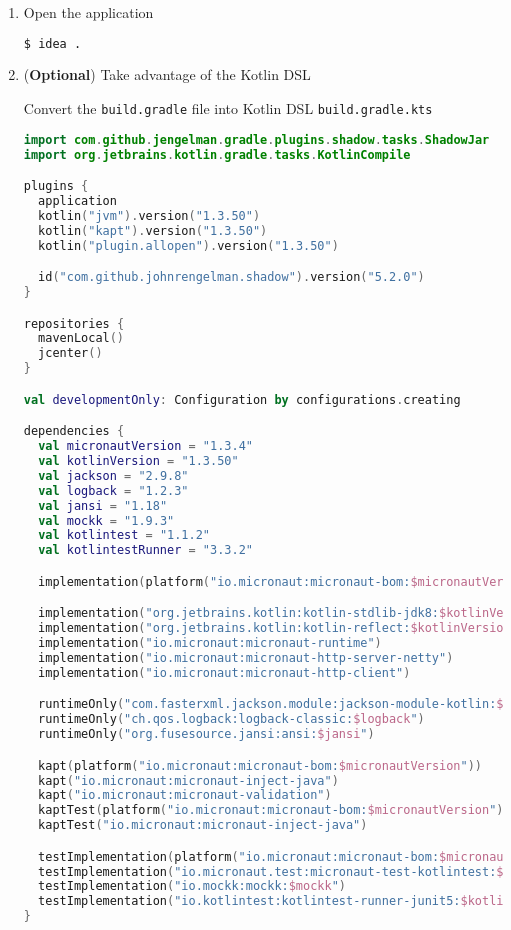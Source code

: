 \documentclass[12pt, letterpaper]{article}
\begin{document}
\begin{enumerate}

	\item Open the application
	      \begin{lstlisting}[language=bash]
$ idea .
	      \end{lstlisting}

	\item (\textbf{Optional}) Take advantage of the Kotlin DSL

	      Convert the \texttt{build.gradle} file into Kotlin DSL \texttt{build.gradle.kts}
	      \begin{lstlisting}[language=Kotlin]
import com.github.jengelman.gradle.plugins.shadow.tasks.ShadowJar
import org.jetbrains.kotlin.gradle.tasks.KotlinCompile

plugins {
  application
  kotlin("jvm").version("1.3.50")
  kotlin("kapt").version("1.3.50")
  kotlin("plugin.allopen").version("1.3.50")

  id("com.github.johnrengelman.shadow").version("5.2.0")
}

repositories {
  mavenLocal()
  jcenter()
}

val developmentOnly: Configuration by configurations.creating

dependencies {
  val micronautVersion = "1.3.4"
  val kotlinVersion = "1.3.50"
  val jackson = "2.9.8"
  val logback = "1.2.3"
  val jansi = "1.18"
  val mockk = "1.9.3"
  val kotlintest = "1.1.2"
  val kotlintestRunner = "3.3.2"

  implementation(platform("io.micronaut:micronaut-bom:$micronautVersion"))

  implementation("org.jetbrains.kotlin:kotlin-stdlib-jdk8:$kotlinVersion")
  implementation("org.jetbrains.kotlin:kotlin-reflect:$kotlinVersion")
  implementation("io.micronaut:micronaut-runtime")
  implementation("io.micronaut:micronaut-http-server-netty")
  implementation("io.micronaut:micronaut-http-client")

  runtimeOnly("com.fasterxml.jackson.module:jackson-module-kotlin:$jackson")
  runtimeOnly("ch.qos.logback:logback-classic:$logback")
  runtimeOnly("org.fusesource.jansi:ansi:$jansi")

  kapt(platform("io.micronaut:micronaut-bom:$micronautVersion"))
  kapt("io.micronaut:micronaut-inject-java")
  kapt("io.micronaut:micronaut-validation")
  kaptTest(platform("io.micronaut:micronaut-bom:$micronautVersion"))
  kaptTest("io.micronaut:micronaut-inject-java")

  testImplementation(platform("io.micronaut:micronaut-bom:$micronautVersion"))
  testImplementation("io.micronaut.test:micronaut-test-kotlintest:$kotlintest")
  testImplementation("io.mockk:mockk:$mockk")
  testImplementation("io.kotlintest:kotlintest-runner-junit5:$kotlintestRunner")
}


\end{lstlisting}
\end{enumerate}
\end{document}

